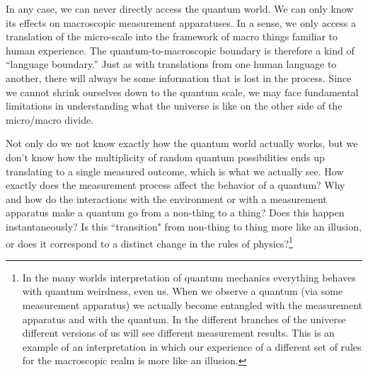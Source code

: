 \documentclass[onecolumn,preprintnumbers,amsmath,amssymbn,reprint,nofootinbib,superscriptaddress]{revtex4}    %
\begin{document}
In any case, we can never directly access the quantum world. We can only know its effects on macroscopic measurement apparatuses. In a sense, we only access a translation of the micro-scale into the framework of macro things familiar to human experience. The quantum-to-macroscopic boundary is therefore a kind of ``language boundary.'' Just as with translations from one human language to another, there will always be some information that is lost in the process.  Since we cannot shrink ourselves down to the quantum scale, we may face fundamental limitations in understanding what the universe is like on the other side of the micro/macro divide.


Not only do we not know exactly how the quantum world actually works, but we don't know how the multiplicity of random quantum possibilities ends up translating to a single measured outcome, which is what we actually see.   How exactly does the measurement process affect the behavior of a quantum?  Why and how do the interactions with the environment or with a measurement apparatus make a quantum go from a non-thing to a thing? Does this happen instantaneously? Is this ``transition" from non-thing to thing more like an illusion, or does it correspond to a distinct change in the rules of physics?\footnote{In the many worlds interpretation of quantum mechanics everything behaves with quantum weirdness, even us. When we observe a quantum (via some measurement apparatus) we actually become entangled with the measurement apparatus and with the quantum. In the different branches of the universe different versions of us will see different measurement results. This is an example of an interpretation in which our experience of a different set of rules for the macroscopic realm is more like an illusion. } 
\end{document}
